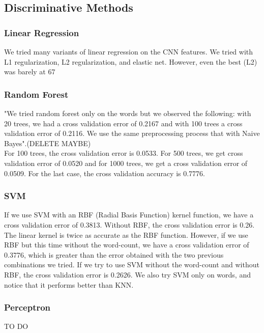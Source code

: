 \documentclass[11pt,twocolumn]{report}
\begin{document}
    
    \subsection*{Discriminative Methods}
    \subsubsection{Linear Regression}
    We tried many variants of linear regression on the CNN features. We tried with L1 regularization, L2 regularization, and elastic net. However, even the best (L2) was barely at 67%
    
     \subsubsection{Random Forest}
     "We tried random forest only on the words but we observed the following: with 20 trees, we had a cross validation error of 0.2167 and with 100 trees a cross validation error of 0.2116. We use the same preprocessing process that with Naive Bayes".(DELETE MAYBE)\\
     For 100 trees, the cross validation error is 0.0533. For 500 trees, we get cross validation error of 0.0520 and for 1000 trees, we get a cross validation error of 0.0509. For the last case, the cross validation accuracy is 0.7776.
    \subsubsection{SVM}
    
    If we use SVM with an RBF (Radial Basis Function) kernel function, we have a cross validation error of 0.3813. Without RBF, the cross validation error is 0.26. The linear kernel is twice as accurate as the RBF function. However, if we use RBF but this time without the word-count, we have a cross validation error of 0.3776, which is greater than the error obtained with the two previous combinations we tried. If we try to use SVM without the word-count and without RBF, the cross validation error is 0.2626. We also try SVM only on words, and notice that it performs better than KNN.
    
    \subsubsection*{Perceptron}
    TO DO
\end{document}
